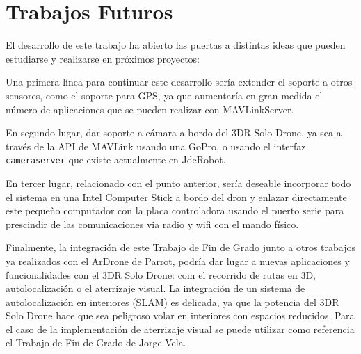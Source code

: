 \section{Trabajos Futuros}

El desarrollo de este trabajo ha abierto las puertas a distintas ideas que pueden estudiarse y realizarse en próximos proyectos:

Una primera línea para continuar este desarrollo sería extender el soporte a otros sensores, como el soporte para GPS, ya que aumentaría en gran medida el número de aplicaciones que se pueden realizar con MAVLinkServer. 

En segundo lugar, dar soporte a cámara a bordo del 3DR Solo Drone, ya sea a través de la API de MAVLink usando una GoPro, o usando el interfaz \texttt{cameraserver} que existe actualmente en JdeRobot.

En tercer lugar, relacionado con el punto anterior, sería deseable incorporar todo el sistema en una Intel Computer Stick a bordo del dron y enlazar directamente este pequeño computador con la placa controladora usando el puerto serie para prescindir de las comunicaciones via radio y wifi con el mando físico. 

Finalmente, la integración de este Trabajo de Fin de Grado junto a otros trabajos ya realizados con el ArDrone de Parrot, podría dar lugar a nuevas aplicaciones y funcionalidades con el 3DR Solo Drone: com el recorrido de rutas en 3D, autolocalización o el aterrizaje visual. La integración de un sistema de autolocalización en interiores (SLAM) es delicada, ya que la potencia del 3DR Solo Drone hace que sea peligroso volar en interiores con espacios reducidos. Para el caso de la implementación de aterrizaje visual se puede utilizar como referencia el Trabajo de Fin de Grado de Jorge Vela\cite{jorgeVela}.